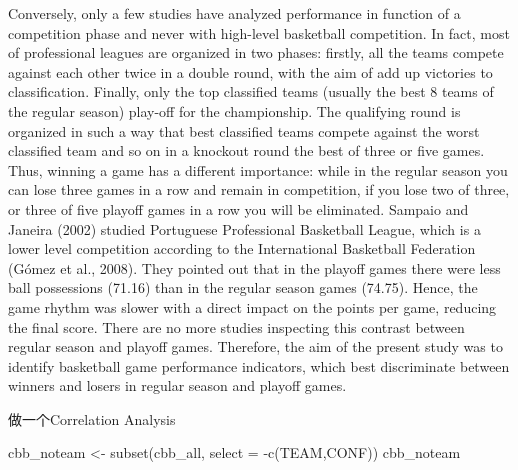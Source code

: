 \documentclass[
]{article}
\newenvironment{Shaded}{\begin{snugshade}}{\end{snugshade}}
\newcommand{\AttributeTok}[1]{\textcolor[rgb]{0.77,0.63,0.00}{#1}}
\newcommand{\FunctionTok}[1]{\textcolor[rgb]{0.00,0.00,0.00}{#1}}
\newcommand{\NormalTok}[1]{#1}
\newcommand{\OtherTok}[1]{\textcolor[rgb]{0.56,0.35,0.01}{#1}}
\newcommand{\SpecialCharTok}[1]{\textcolor[rgb]{0.00,0.00,0.00}{#1}}
\begin{document}
Conversely, only a few studies have analyzed performance in function of
a competition phase and never with high-level basketball competition. In
fact, most of professional leagues are organized in two phases: firstly,
all the teams compete against each other twice in a double round, with
the aim of add up victories to classification. Finally, only the top
classified teams (usually the best 8 teams of the regular season)
play-off for the championship. The qualifying round is organized in such
a way that best classified teams compete against the worst classified
team and so on in a knockout round the best of three or five games.
Thus, winning a game has a different importance: while in the regular
season you can lose three games in a row and remain in competition, if
you lose two of three, or three of five playoff games in a row you will
be eliminated. Sampaio and Janeira (2002) studied Portuguese
Professional Basketball League, which is a lower level competition
according to the International Basketball Federation (Gómez et al.,
2008). They pointed out that in the playoff games there were less ball
possessions (71.16) than in the regular season games (74.75). Hence, the
game rhythm was slower with a direct impact on the points per game,
reducing the final score. There are no more studies inspecting this
contrast between regular season and playoff games. Therefore, the aim of
the present study was to identify basketball game performance
indicators, which best discriminate between winners and losers in
regular season and playoff games.

做一个Correlation Analysis

\begin{Shaded}
\begin{Highlighting}[]
\NormalTok{cbb\_noteam }\OtherTok{\textless{}{-}} \FunctionTok{subset}\NormalTok{(cbb\_all, }\AttributeTok{select =} \SpecialCharTok{{-}}\FunctionTok{c}\NormalTok{(TEAM,CONF))}
\NormalTok{cbb\_noteam}
\end{Highlighting}
\end{Shaded}
\end{document}
